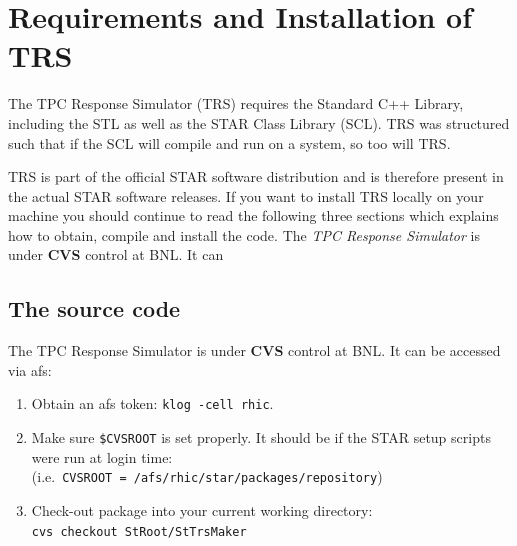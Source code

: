 \documentclass[twoside]{article}
\newcommand{\name}[1]{\textsf{#1}}%
\newcommand{\comp}[1]{\texttt{#1}}%
\begin{document}
\section{Requirements and Installation of TRS}   
\label{install}

The TPC Response Simulator (\name{TRS}) requires the Standard C++ Library,
including the STL  as well as the STAR Class Library (SCL).
\name{TRS} was structured such that if the SCL will
compile and run on a system, so too will \name{TRS}.

\name{TRS} is part of the official STAR software distribution
and is therefore present in the actual STAR software releases.
If you want to install \name{TRS} locally on your machine you should
continue to read the following three sections which explains how to
obtain, compile and install the code.
The {\em TPC Response Simulator} is under {\bf CVS} control at BNL.  It can
\subsection{The source code} 

The \name{TPC Response Simulator} is under {\bf CVS} control at BNL.  It can
be accessed via \name{afs}:   
\begin{enumerate}
  \item Obtain an \name{afs} token: \comp{klog -cell rhic}.
  \item Make sure \comp{\$CVSROOT} is set properly.  It should be
    if the STAR setup scripts were run at login time:\\
    (i.e.~\comp{CVSROOT = /afs/rhic/star/packages/repository})
  \item Check-out package into your current working directory:\\
    \comp{cvs checkout StRoot/StTrsMaker}
\end{enumerate}
\end{document}
